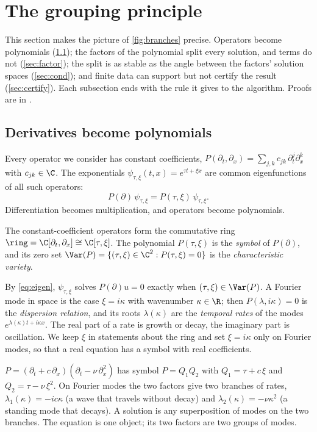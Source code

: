 \section{The grouping principle}\label{sec:theory}
This section makes the picture of \cref{fig:branches} precise. Operators become polynomials (\cref{sec:ring}); the
factors of the polynomial split every solution, and terms do not (\cref{sec:factor}); the split is as stable as the angle
between the factors' solution spaces (\cref{sec:cond}); and finite data can support but not certify the result
(\cref{sec:certify}). Each subsection ends with the rule it gives to the algorithm. Proofs are in \SMproofs.

\subsection{Derivatives become polynomials}\label{sec:ring}
Every operator we consider has constant coefficients,
$P(\partial_t,\partial_x)=\sum_{j,k}c_{jk}\,\partial_t^j\partial_x^k$ with $c_{jk}\in\C$. The exponentials $\psi_{\tau,\xi}(t,x)=e^{\tau t+\xi x}$ are common eigenfunctions of all such operators:
\begin{equation}\label{eq:eigen}
  P(\partial)\,\psi_{\tau,\xi}=P(\tau,\xi)\,\psi_{\tau,\xi}.
\end{equation}
Differentiation becomes multiplication, and operators become polynomials.

\begin{definition}\label{def:ring}
The constant-coefficient operators form the commutative ring $\ring=\C[\partial_t,\partial_x]\cong\C[\tau,\xi]$. The
polynomial $P(\tau,\xi)$ is the \emph{symbol} of $P(\partial)$, and its zero set
$\Var(P)=\{(\tau,\xi)\in\C^2:P(\tau,\xi)=0\}$ is the \emph{characteristic variety}.
\end{definition}

By \eqref{eq:eigen}, $\psi_{\tau,\xi}$ solves $P(\partial)u=0$ exactly when $(\tau,\xi)\in\Var(P)$. A Fourier mode in
space is the case $\xi=i\kappa$ with wavenumber $\kappa\in\R$; then $P(\lambda,i\kappa)=0$ is the \emph{dispersion
relation}, and its roots $\lambda(\kappa)$ are the \emph{temporal rates} of the modes $e^{\lambda(\kappa)t+i\kappa x}$.
The real part of a rate is growth or decay, the imaginary part is oscillation. We keep $\xi$ in statements about the
ring and set $\xi=i\kappa$ only on Fourier modes, so that a real equation has a symbol with real coefficients.

\begin{example}\label{ex:running}
$P=(\partial_t+c\,\partial_x)(\partial_t-\nu\,\partial_x^2)$ has symbol $P=Q_1Q_2$ with $Q_1=\tau+c\,\xi$ and
$Q_2=\tau-\nu\,\xi^2$. On Fourier modes the two factors give two branches of rates, $\lambda_1(\kappa)=-ic\kappa$ (a
wave that travels without decay) and $\lambda_2(\kappa)=-\nu\kappa^2$ (a standing mode that decays). A solution is any
superposition of modes on the two branches. The equation is one object; its two factors are two groups of modes.
\end{example}

